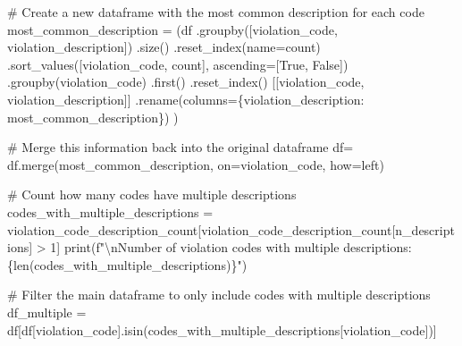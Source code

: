 \documentclass[
  letterpaper,
  DIV=11,
  numbers=noendperiod]{scrartcl}
\newenvironment{Shaded}{\begin{snugshade}}{\end{snugshade}}
\newcommand{\BuiltInTok}[1]{\textcolor[rgb]{0.00,0.23,0.31}{#1}}
\newcommand{\CharTok}[1]{\textcolor[rgb]{0.13,0.47,0.30}{#1}}
\newcommand{\CommentTok}[1]{\textcolor[rgb]{0.37,0.37,0.37}{#1}}
\newcommand{\DecValTok}[1]{\textcolor[rgb]{0.68,0.00,0.00}{#1}}
\newcommand{\NormalTok}[1]{\textcolor[rgb]{0.00,0.23,0.31}{#1}}
\newcommand{\OperatorTok}[1]{\textcolor[rgb]{0.37,0.37,0.37}{#1}}
\newcommand{\SpecialCharTok}[1]{\textcolor[rgb]{0.37,0.37,0.37}{#1}}
\newcommand{\SpecialStringTok}[1]{\textcolor[rgb]{0.13,0.47,0.30}{#1}}
\newcommand{\StringTok}[1]{\textcolor[rgb]{0.13,0.47,0.30}{#1}}
\newcommand{\VariableTok}[1]{\textcolor[rgb]{0.07,0.07,0.07}{#1}}
\begin{document}
\begin{Shaded}
\begin{Highlighting}[]
\CommentTok{\# Create a new dataframe with the most common description for each code}
\NormalTok{most\_common\_description }\OperatorTok{=}\NormalTok{ (df}
\NormalTok{    .groupby([}\StringTok{\textquotesingle{}violation\_code\textquotesingle{}}\NormalTok{, }\StringTok{\textquotesingle{}violation\_description\textquotesingle{}}\NormalTok{])}
\NormalTok{    .size()}
\NormalTok{    .reset\_index(name}\OperatorTok{=}\StringTok{\textquotesingle{}count\textquotesingle{}}\NormalTok{)}
\NormalTok{    .sort\_values([}\StringTok{\textquotesingle{}violation\_code\textquotesingle{}}\NormalTok{, }\StringTok{\textquotesingle{}count\textquotesingle{}}\NormalTok{], ascending}\OperatorTok{=}\NormalTok{[}\VariableTok{True}\NormalTok{, }\VariableTok{False}\NormalTok{])}
\NormalTok{    .groupby(}\StringTok{\textquotesingle{}violation\_code\textquotesingle{}}\NormalTok{)}
\NormalTok{    .first()}
\NormalTok{    .reset\_index()}
\NormalTok{    [[}\StringTok{\textquotesingle{}violation\_code\textquotesingle{}}\NormalTok{, }\StringTok{\textquotesingle{}violation\_description\textquotesingle{}}\NormalTok{]]}
\NormalTok{    .rename(columns}\OperatorTok{=}\NormalTok{\{}\StringTok{\textquotesingle{}violation\_description\textquotesingle{}}\NormalTok{: }\StringTok{\textquotesingle{}most\_common\_description\textquotesingle{}}\NormalTok{\})}
\NormalTok{)}

\CommentTok{\# Merge this information back into the original dataframe}
\NormalTok{df}\OperatorTok{=}\NormalTok{ df.merge(most\_common\_description, on}\OperatorTok{=}\StringTok{\textquotesingle{}violation\_code\textquotesingle{}}\NormalTok{, how}\OperatorTok{=}\StringTok{\textquotesingle{}left\textquotesingle{}}\NormalTok{)}


\CommentTok{\# Count how many codes have multiple descriptions}
\NormalTok{codes\_with\_multiple\_descriptions }\OperatorTok{=}\NormalTok{ violation\_code\_description\_count[violation\_code\_description\_count[}\StringTok{\textquotesingle{}n\_descriptions\textquotesingle{}}\NormalTok{] }\OperatorTok{\textgreater{}} \DecValTok{1}\NormalTok{]}
\BuiltInTok{print}\NormalTok{(}\SpecialStringTok{f"}\CharTok{\textbackslash{}n}\SpecialStringTok{Number of violation codes with multiple descriptions: }\SpecialCharTok{\{}\BuiltInTok{len}\NormalTok{(codes\_with\_multiple\_descriptions)}\SpecialCharTok{\}}\SpecialStringTok{"}\NormalTok{)}

\CommentTok{\# Filter the main dataframe to only include codes with multiple descriptions}
\NormalTok{df\_multiple }\OperatorTok{=}\NormalTok{ df[df[}\StringTok{\textquotesingle{}violation\_code\textquotesingle{}}\NormalTok{].isin(codes\_with\_multiple\_descriptions[}\StringTok{\textquotesingle{}violation\_code\textquotesingle{}}\NormalTok{])]}


\end{Highlighting}
\end{Shaded}
\end{document}
